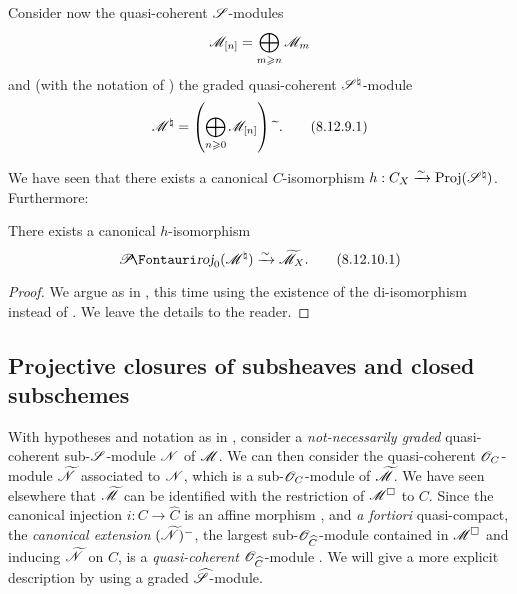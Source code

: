 \begin{env}[8.12.9]
\label{II.8.12.9}
Consider now the quasi-coherent $\mathscr{S}$-modules
\[
    \mathscr{M}_{[n]}=\bigoplus_{m\geqslant n}\mathscr{M}_m
\]
and (with the notation of ) the graded quasi-coherent $\mathscr{S}^\natural$-module
\[
\label{II.8.12.9.1}
    \mathscr{M}^\natural=\left(\bigoplus_{n\geqslant0}\mathscr{M}_{[n]}\right){\,\widetilde{\,}\,}.
\tag{8.12.9.1}
\]

We have seen  that there exists a canonical $C$-isomorphism $h:C_X\xrightarrow{\sim}\operatorname{Proj}(\mathscr{S}^\natural)$.
Furthermore:
\end{env}

\begin{proposition}[8.12.10]
\label{II.8.12.10}
There exists a canonical $h$-isomorphism
\[
\label{II.8.12.10.1}
    \shProj_0(\sh{M}^\natural) \simto \widetilde{\sh{M}}_X.
\tag{8.12.10.1}
\]
\end{proposition}

\begin{proof}
We argue as in , this time using the existence of the di-isomorphism  instead of .
We leave the details to the reader.
\end{proof}


\subsection{Projective closures of subsheaves and closed subschemes}
\label{subsection:II.8.13}

\begin{env}[8.13.1]
\label{II.8.13.1}
With hypotheses and notation as in , consider a \emph{not-necessarily graded} quasi-coherent sub-$\mathscr{S}$-module $\mathscr{N}$ of $\mathscr{M}$.
We can then consider the quasi-coherent $\mathscr{O}_C$-module $\widetilde{\mathscr{N}}$ associated to $\mathscr{N}$, which is a sub-$\mathscr{O}_C$-module of $\widetilde{\mathscr{M}}$.
We have seen elsewhere  that $\widetilde{\mathscr{M}}$ can be identified with the restriction of $\mathscr{M}^\square$ to $C$.
Since the canonical injection $i:C\to\widehat{C}$ is an affine morphism , and \emph{a fortiori} quasi-compact, the \emph{canonical extension} $(\widetilde{\mathscr{N}})^-$, the largest sub-$\mathscr{O}_{\widehat{C}}$-module contained in $\mathscr{M}^\square$ and inducing $\widetilde{\mathscr{N}}$ on $C$, is a \emph{quasi-coherent} $\mathscr{O}_{\widehat{C}}$-module .
We will give a more explicit description by using a graded $\widehat{\mathscr{S}}$-module.
\end{env}

